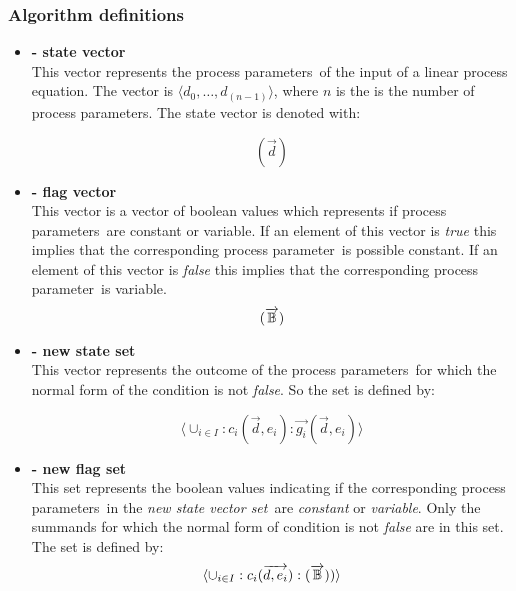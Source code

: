 \documentclass[a4paper,10pt]{article}
\newcommand{\lpe}{linear process equation}
\newcommand{\ovr}{\overrightarrow}
\newcommand{\pp}{process parameter}
\newcommand{\pps}{process parameters}
\newcommand{\ti}{\textit}
\newcommand{\svs}{\textit{new state vector set}}
\begin{document}
\subsubsection{Algorithm definitions} \label{sss:algdef}
\begin{itemize}
\item \begin{defn} \textbf{- state vector}\\
This vector represents the \pps\ of the input of a \lpe . The vector is 
$\langle d_0, \ldots, d_(n-1) \rangle$, where $n$ is the is the number
of \pps . The state vector is denoted with: 

\begin{displaymath}
(\ovr{d})
\end{displaymath}
\end{defn}

\item \begin{defn} \textbf{- flag vector}\\
This vector is a vector of boolean values which represents if \pps\
are constant or variable. If an element of this vector is \ti{true}
this implies that the corresponding \pp\ is possible constant. If an element
of this vector is \ti{false} this implies that the corresponding
\pp\ is variable.
\begin{displaymath}
(\ovr{\Bbb{B}})
\end{displaymath}
\end{defn}

\item \begin{defn} \textbf{- new state set}\\
 This vector represents the outcome of the
\pps\ for which the normal form of the condition is not \ti{false}. So
the set is defined by:

\begin{displaymath}\langle \cup_{i \in I}: c_i(\ovr{d},
e_i) :\ovr{g_i}(\ovr{d},e_i) \rangle
\end{displaymath}
\end{defn}

\item \begin{defn}
\textbf{- new flag set} \\
This set represents the boolean values indicating if the
corresponding \pps\ in the \svs\ are \ti{constant} or \ti{variable}. Only the summands for
which the normal form of condition is not \ti{false} are in this set. The set is
defined by:
\begin{displaymath}
\langle \cup_{i \in I}: c_i(\ovr{d, e_i}) : (\ovr{\Bbb{B}}) ) \rangle
\end{displaymath}
\end{defn}
\end{itemize}
\end{document}
